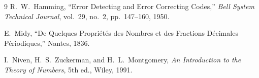 \documentclass[11pt]{article}
\theoremstyle{definition}
\theoremstyle{remark}
\begin{document}
\begin{thebibliography}{9}
 R.~W.~Hamming, ``Error Detecting and Error
  Correcting Codes,'' \emph{Bell System Technical Journal}, vol.~29,
  no.~2, pp.~147--160, 1950.

 E.~Midy, ``De Quelques Propri\'et\'es des Nombres
  et des Fractions D\'ecimales P\'eriodiques,'' Nantes, 1836.

 I.~Niven, H.~S.~Zuckerman, and H.~L.~Montgomery,
  \emph{An Introduction to the Theory of Numbers}, 5th ed., Wiley, 1991.
\end{thebibliography}
\end{document}
